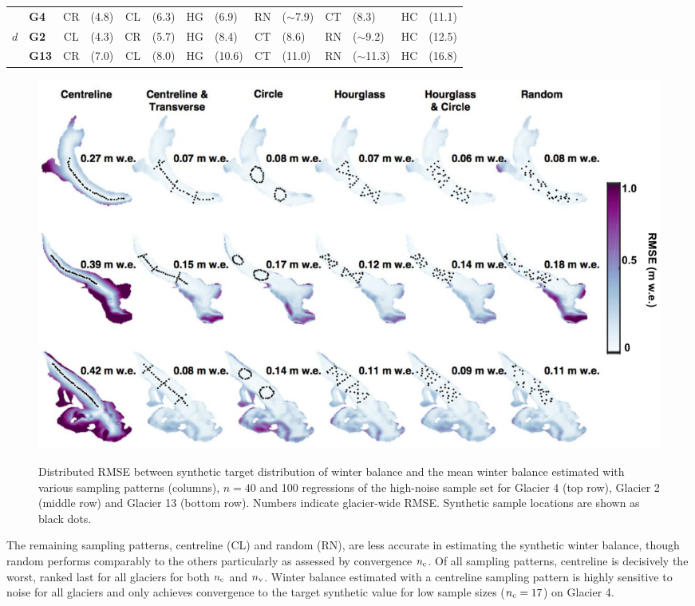 \documentclass[twocolumn,letterpaper]{igs}
\begin{document}
\begin{table}[]
\begin{tabular}{clclclclclclcl}
\hline
                & \textbf{G4}   & \textcolor{CR}{CR}         & (4.8) & \textcolor{CL}{CL}         & (6.3) & \textcolor{HG}{HG}                 & (6.9)         & \textcolor{RN}{RN}         & ($\sim$7.9) & \textcolor{CT}{CT}         & (8.3) & \textcolor{HC}{HC} & (11.1) \\
$d$        & \textbf{G2}   & \textcolor{CL}{CL}         & (4.3) & \textcolor{CR}{CR}         & (5.7) & \textcolor{HG}{HG}                 & (8.4)         & \textcolor{CT}{CT} & (8.6)         & \textcolor{RN}{RN}                 & ($\sim$9.2) & \textcolor{HC}{HC} & (12.5) \\
                & \textbf{G13} & \textcolor{CR}{CR}         & (7.0) & \textcolor{CL}{CL}         & (8.0) & \textcolor{HG}{HG}                 & (10.6)         & \textcolor{CT}{CT} & (11.0)         & \textcolor{RN}{RN}                 & ($\sim$11.3) & \textcolor{HC}{HC} & (16.8)\\
\hline
\end{tabular}
\end{table}


\begin{figure}
	\centering
	\includegraphics[width =\textwidth]{Pulwicki_Fig4.pdf}\\
	\caption{Distributed RMSE between synthetic target distribution of winter balance and the mean winter balance estimated with various sampling patterns (columns), $n=40$ and 100 regressions of the high-noise sample set for Glacier 4 (top row), Glacier 2 (middle row) and Glacier 13 (bottom row). Numbers indicate glacier-wide RMSE. Synthetic sample locations are shown as black dots.}
	\label{fig:SynObsRMSEmap}
\end{figure}


The remaining sampling patterns, centreline (CL) and random (RN), are less accurate in estimating the synthetic winter balance, though random performs comparably to the others particularly as assessed by convergence $n_{\rm c}$. 
Of all sampling patterns, centreline is decisively the worst, ranked last for all glaciers for both $n_{\rm c}$ and $n_{\rm v}$. Winter balance estimated with a centreline sampling pattern is highly sensitive to noise for all glaciers and only achieves convergence to the target synthetic value for low sample sizes ($n_{\rm c}=17$) on Glacier 4. 
\end{document}
